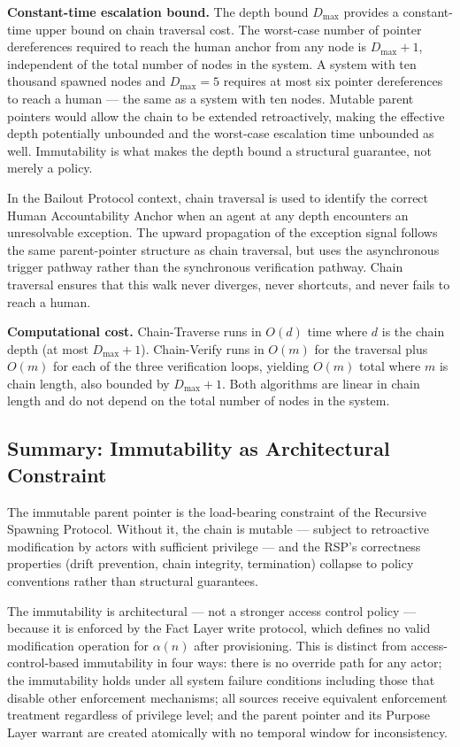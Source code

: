 \medskip
\noindent\textbf{Constant-time escalation bound.} The depth bound $D_{\max}$ provides a constant-time upper bound on chain traversal cost. The worst-case number of pointer dereferences required to reach the human anchor from any node is $D_{\max} + 1$, independent of the total number of nodes in the system. A system with ten thousand spawned nodes and $D_{\max} = 5$ requires at most six pointer dereferences to reach a human — the same as a system with ten nodes. Mutable parent pointers would allow the chain to be extended retroactively, making the effective depth potentially unbounded and the worst-case escalation time unbounded as well. Immutability is what makes the depth bound a structural guarantee, not merely a policy.

In the Bailout Protocol context, chain traversal is used to identify the correct Human Accountability Anchor when an agent at any depth encounters an unresolvable exception. The upward propagation of the exception signal follows the same parent-pointer structure as chain traversal, but uses the asynchronous trigger pathway rather than the synchronous verification pathway. Chain traversal ensures that this walk never diverges, never shortcuts, and never fails to reach a human.

\medskip
\noindent\textbf{Computational cost.} Chain-Traverse runs in $O(d)$ time where $d$ is the chain depth (at most $D_{\max} + 1$). Chain-Verify runs in $O(m)$ for the traversal plus $O(m)$ for each of the three verification loops, yielding $O(m)$ total where $m$ is chain length, also bounded by $D_{\max} + 1$. Both algorithms are linear in chain length and do not depend on the total number of nodes in the system.

\subsection{Summary: Immutability as Architectural Constraint}
\label{sec:immutability-summary}

The immutable parent pointer is the load-bearing constraint of the Recursive Spawning Protocol. Without it, the chain is mutable — subject to retroactive modification by actors with sufficient privilege — and the RSP's correctness properties (drift prevention, chain integrity, termination) collapse to policy conventions rather than structural guarantees.

The immutability is architectural — not a stronger access control policy — because it is enforced by the Fact Layer write protocol, which defines no valid modification operation for $\alpha(n)$ after provisioning. This is distinct from access-control-based immutability in four ways: there is no override path for any actor; the immutability holds under all system failure conditions including those that disable other enforcement mechanisms; all sources receive equivalent enforcement treatment regardless of privilege level; and the parent pointer and its Purpose Layer warrant are created atomically with no temporal window for inconsistency.

